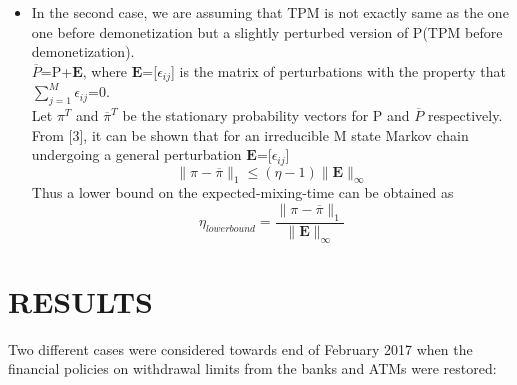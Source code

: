 \documentclass[12pt]{article}
\begin{document}
\begin{itemize}
	\item In the second case, we are assuming that TPM is not exactly same as the one one before demonetization but a slightly perturbed version of P(TPM before demonetization). \\
	$\overline{P}$=P+$\textbf{E}$, \hspace{2pt} where $\textbf{E}$=[$\epsilon_{ij}$] is the matrix of perturbations with the property that $\sum_{j=1}^{M}\epsilon_{ij}$=0.\\
	Let $\pi^{T}$ and $\overline{\pi}^{T}$ be the stationary probability vectors for P and $\overline{P}$ respectively.\\
	From [3], it can be shown that for an irreducible M state Markov chain undergoing a general perturbation $\textbf{E}$=[$\epsilon_{ij}$]\\
	\begin{equation}
		\| \pi - \overline{\pi}\|_{1} \leq (\eta-1)\|\textbf{E}\|_{\infty}
	\end{equation}
	Thus a lower bound on the expected-mixing-time can be obtained as
	\begin{equation}
	\eta_{lower bound} =  \frac{\| \pi - \overline{\pi}\|_{1}}{\|\textbf{E}\|_{\infty}}
	\end{equation}
\end{itemize}


\section{RESULTS}

Two different cases were considered towards end of February 2017 when the financial policies on withdrawal limits from the banks and ATMs were restored:
\end{document}
